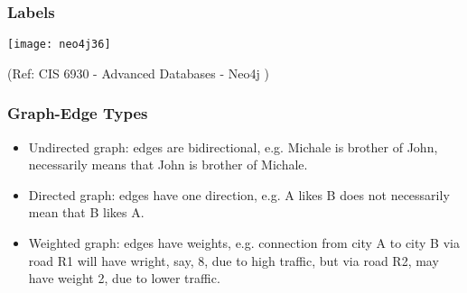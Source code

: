 \begin{frame}\frametitle{Labels}


\begin{center}
\texttt{[image: neo4j36]}
\end{center}	

{\tiny (Ref: CIS 6930 - Advanced Databases - Neo4j )}
\end{frame}


\begin{frame}\frametitle{Graph-Edge Types}

\begin{itemize}
\item Undirected graph: edges are bidirectional, e.g. Michale is brother of John, necessarily means that John is brother of Michale.
\item Directed graph: edges have one direction, e.g. A likes B does not necessarily mean that B likes A.
\item Weighted graph: edges have weights, e.g. connection from city A to city B via road R1 will have wright, say, 8, due to high traffic, but via road R2, may have weight 2, due to lower traffic.
\end{itemize}

\end{frame}





